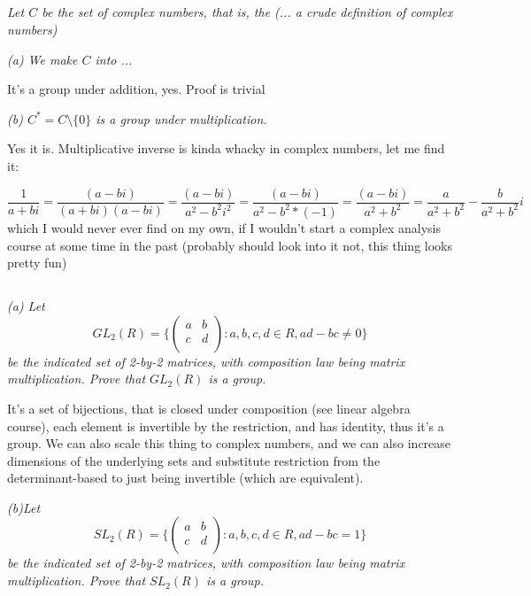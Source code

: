 \documentclass[11pt,oneside,titlepage]{book}
\newcommand{\set}[1]{\{ #1 \}}
\begin{document}
\subsection{}

\textit{Let $C$ be the set of complex numbers, that is, the (... a
crude definition of complex numbers)}

\textit{(a) We make $C$ into ...}

It's a group under addition, yes. Proof is trivial

\textit{(b) $C^* = C \setminus \set{0}$ is a group under multiplication.}

Yes it is. Multiplicative inverse is kinda whacky in complex numbers, let me find it:

$$\frac{1}{a + bi} = \frac{(a - bi)}{(a + bi)(a - bi)} =
\frac{(a - bi)}{a^2 - b^2i^2} = \frac{(a - bi)}{a^2 - b^2 * (-1)}  =
\frac{(a - bi)}{a^2 + b^2}  = \frac{a}{a^2 + b^2}  - \frac{b}{a^2 + b^2}i$$
which I would never ever find on my own, if I wouldn't start a complex
analysis course at some time in the past (probably should look into 
it not, this thing looks pretty fun)

\subsection{}

\textit{(a) Let
$$GL_2(R) = \set{
  \begin{pmatrix}
    a & b \\
    c & d \\
  \end{pmatrix}: a, b, c, d \in R, ad - bc \neq 0}
  $$
  be the indicated set of 2-by-2 matrices, with composition law being matrix multiplication.
  Prove that $GL_2(R)$ is a group.
}

It's a set of bijections, that is closed under composition (see linear
algebra course), each element is invertible by the restriction, and
has identity, thus it's a group.  We can also scale this thing to
complex numbers, and we can also increase dimensions of the underlying
sets and substitute restriction from the determinant-based to just
being invertible (which are equivalent).

\textit{(b)Let
$$SL_2(R) = \set{
  \begin{pmatrix}
    a & b \\
    c & d \\
  \end{pmatrix}: a, b, c, d \in R, ad - bc = 1}
  $$
  be the indicated set of 2-by-2 matrices, with composition law being matrix multiplication.
  Prove that $SL_2(R)$ is a group.
}
\end{document}

